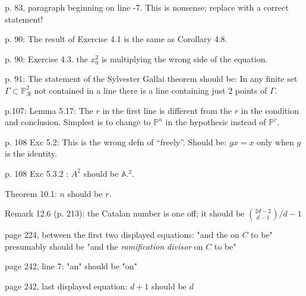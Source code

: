 \documentclass[twoside,12pt, leqno]{amsart}
\def\PP{{\mathbb P}}
\def\RR{{\mathcal R}}
\begin{document}
p. 83, paragraph beginning on line -7. This is nonsense; replace with a correct statement!

p. 90: The result of Exercise 4.1 is the same as Corollary 4.8.

p. 90: Exercise 4.3. the $x_0^2$ is multiplying the wrong side of the equation.

p. 91: The statement of the Sylvester Gallai theorem should be:
In any finite set $\Gamma\subset \PP^2_\RR$ not contained in a line
there is a line containing just 2 points of $\Gamma$.

p.107: Lemma 5.17: The $r$ in the first line is different from the $r$ in the condition and
conclusion. Simplest is to change to $\PP^n$ in the hypothesis instead of $\PP^r$.

p. 108 Exc 5.2: This is the wrong defn of ``freely''. Should be: $gx = x$ only when $g$
is the identity.

p. 108 Exc 5.3.2 : $A^2$ should be $\mathbb A.^2$.

Theorem 10.1: $n$ should be $r$.

Remark 12.6 (p. 213): the Catalan number is one off; it should be $\binom{2d-2}{d-1}/d-1$

page 224, between the first two displayed equations: "and the on $C$ to be" presumably should be "and the \emph{ramification divisor} on $C$ to be"

page 242, line 7: "an" should be "on"

page 242, last displayed equation: $d+1$ should be $d$



\end{document}
